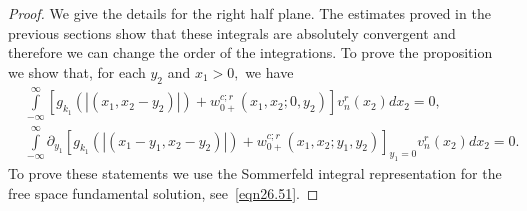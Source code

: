 \documentclass[11pt]{article}
\newcommand\pa{\partial}
\theoremstyle{definition}
\theoremstyle{remark}
\begin{document}
\begin{proof}
  We give the details for the right half plane. The estimates proved in the
  previous sections show that these integrals are absolutely convergent and
  therefore we can change the order of the integrations. To prove the
  proposition we show that, for each $y_2$ and $x_1>0,$ we have
   \begin{equation}\label{eqn212.93} 
    \begin{split}
     &\int\limits_{-\infty}^{\infty}[g_{k_1}(|(x_1,x_2-y_2)|)+
        w^{c;r}_{0+}(x_1,x_2;0,y_2)]v_n^{r}(x_2)dx_2=0,\\
     &\int\limits_{-\infty}^{\infty}\pa_{y_1}[g_{k_1}(|(x_1-y_1,x_2-y_2)|)+
        w^{c;r}_{0+}(x_1,x_2;y_1,y_2)]_{y_1=0}v_n^{r}(x_2)dx_2=0.
    \end{split}
  \end{equation}
  To prove these statements we use the Sommerfeld integral representation for
  the free space fundamental solution, see~\eqref{eqn26.51}.


\end{proof}
\end{document}
